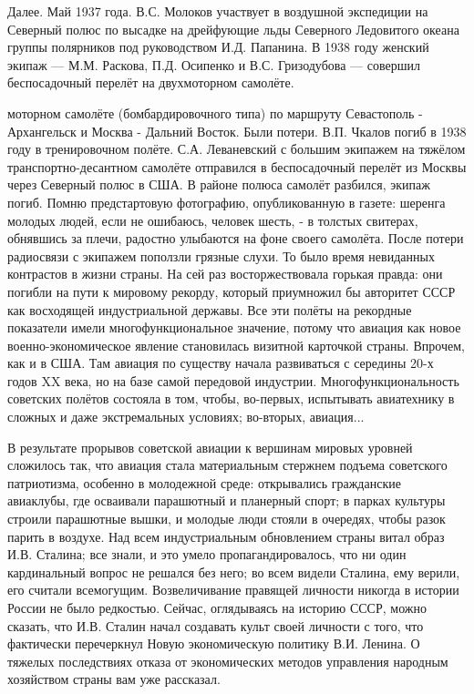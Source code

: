 Далее. Май 1937 года. В.С. Молоков участвует в воздушной экспедиции на Северный полюс по высадке на дрейфующие льды Северного Ледовитого океана группы полярников под руководством И.Д. Папанина. В 1938 году женский экипаж — М.М. Раскова, П.Д. Осипенко и В.С. Гризодубова — совершил беспосадочный перелёт на двухмоторном самолёте.

\label{176-1}
моторном самолёте (бомбардировочного типа) по маршруту Севастополь - Архангельск и Москва - Дальний Восток. Были потери. В.П. Чкалов погиб в 1938 году в тренировочном полёте. С.А. Леваневский с большим экипажем на тяжёлом транспортно-десантном самолёте отправился в беспосадочный перелёт из Москвы через Северный полюс в США. В районе полюса самолёт разбился, экипаж погиб.
Помню предстартовую фотографию, опубликованную в газете: шеренга молодых людей, если не ошибаюсь, человек шесть, - в толстых свитерах, обнявшись за плечи, радостно улыбаются на фоне своего самолёта. После потери радиосвязи с экипажем поползли грязные слухи. То было время невиданных контрастов в жизни страны. На сей раз восторжествовала горькая правда: они погибли на пути к мировому рекорду, который приумножил бы авторитет СССР как восходящей индустриальной державы.
Все эти полёты на рекордные показатели имели многофункциональное значение, потому что авиация как новое военно-экономическое явление становилась визитной карточкой страны. Впрочем, как и в США. Там авиация по существу начала развиваться с середины 20-х годов XX века, но на базе самой передовой индустрии. Многофункциональность советских полётов состояла в том, чтобы, во-первых, испытывать авиатехнику в сложных и даже экстремальных условиях; во-вторых, авиация...

\label{177-1}
В результате прорывов советской авиации к вершинам мировых уровней сложилось так, что авиация стала материальным стержнем подъема советского патриотизма, особенно в молодежной среде: открывались гражданские авиаклубы, где осваивали парашютный и планерный спорт; в парках культуры строили парашютные вышки, и молодые люди стояли в очередях, чтобы разок парить в воздухе. Над всем индустриальным обновлением страны витал образ И.В. Сталина; все знали, и это умело пропагандировалось, что ни один кардинальный вопрос не решался без него; во всем видели Сталина, ему верили, его считали всемогущим. Возвеличивание правящей личности никогда в истории России не было редкостью. Сейчас, оглядываясь на историю СССР, можно сказать, что И.В. Сталин начал создавать культ своей личности с того, что фактически перечеркнул Новую экономическую политику В.И. Ленина. О тяжелых последствиях отказа от экономических методов управления народным хозяйством страны вам уже рассказал.
